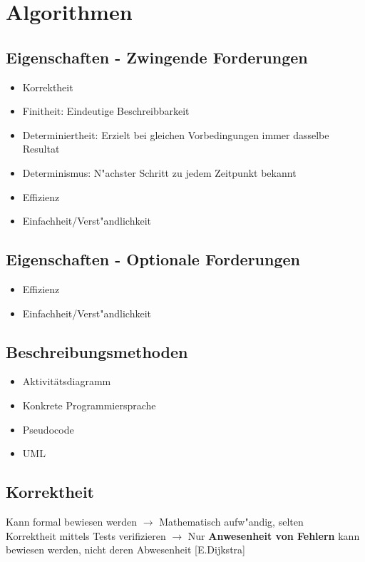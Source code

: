 \section{Algorithmen}
\subsection{Eigenschaften - Zwingende Forderungen}
\begin{itemize}
	\item Korrektheit
	\item Finitheit: Eindeutige Beschreibbarkeit
	\item Determiniertheit: Erzielt bei gleichen Vorbedingungen immer dasselbe Resultat
	\item Determinismus: N"achster Schritt zu jedem Zeitpunkt bekannt
	\item Effizienz 
	\item Einfachheit/Verst"andlichkeit
\end{itemize}

\subsection{Eigenschaften - Optionale Forderungen}
\begin{itemize}
	\item Effizienz 
	\item Einfachheit/Verst"andlichkeit
\end{itemize}

\subsection{Beschreibungsmethoden}
\begin{itemize}
	\item Aktivitätsdiagramm
	\item Konkrete Programmiersprache
	\item Pseudocode
	\item UML
\end{itemize}

\subsection{Korrektheit}
Kann formal bewiesen werden $\rightarrow$ Mathematisch aufw"andig, selten\\
Korrektheit mittels Tests verifizieren $\rightarrow$ Nur \textbf{Anwesenheit von Fehlern} kann bewiesen werden, nicht deren Abwesenheit [E.Dijkstra]

